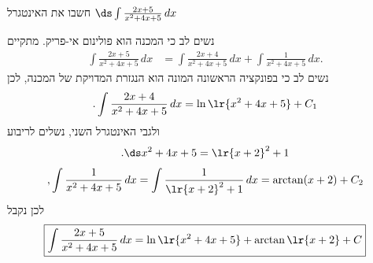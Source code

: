 חשבו את האינטגרל
$\ds \int\frac{2x+5}{x^2+4x+5}\,dx$
\begin{solbox}
נשים לב כי המכנה הוא פולינום אי-פריק.
מתקיים
\begin{align*}
\int\frac{2x+5}{x^2+4x+5}\,dx
&=\int\frac{2x+4}{x^2+4x+5}\,dx+\int\frac{1}{x^2+4x+5}\,dx.
\end{align*}
נשים לב כי בפונקציה הראשונה המונה הוא הנגזרת המדויקת של המכנה, לכן
$$.\int\frac{2x+4}{x^2+4x+5}\,dx=\ln\lr{x^2+4x+5}+C_1$$
ולגבי האינטגרל השני, נשלים לריבוע
$$.\ds x^2+4x+5=\lr{x+2}^2+1$$
$$,\int\frac{1}{x^2+4x+5}\,dx=\int\frac{1}{\lr{x+2}^2+1}\,dx=\arctan(x+2)+C_2$$
לכן נקבל
\begin{align*}
\boxed{\int\frac{2x+5}{x^2+4x+5}\,dx=\ln\lr{x^2+4x+5}+\arctan\lr{x+2}+C}
\end{align*}
\end{solbox}
